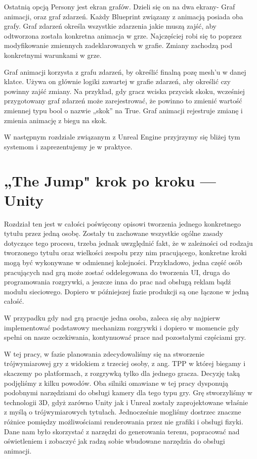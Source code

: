 \documentclass[12pt]{xmgr}
\begin{document}
Ostatnią opcją Persony jest ekran grafów. Dzieli się on na dwa ekrany- Graf animacji, oraz graf zdarzeń. Każdy Blueprint związany z animacją posiada oba grafy.
Graf zdarzeń określa wszystkie zdarzenia jakie muszą zajść, aby odtworzona została konkretna animacja w grze. Najczęściej robi się to poprzez modyfikowanie zmiennych zadeklarowanych w grafie. Zmiany zachodzą pod konkretnymi warunkami w grze.

Graf animacji korzysta z grafu zdarzeń, by określić finalną pozę mesh’u w danej klatce. Używa on głównie logiki zawartej w grafie zdarzeń, aby określić czy powinny zajść zmiany. Na przykład, gdy gracz wciska przycisk skoku, wcześniej przygotowany graf zdarzeń może zarejestrować, że powinno to zmienić wartość zmiennej typu bool o nazwie „skok” na True.  Graf animacji rejestruje zmianę i zmienia animację z biegu na skok.

W następnym rozdziale związanym  z Unreal Engine przyjrzymy się bliżej tym systemom i zaprezentujemy je w praktyce.

\chapter{„The Jump" krok po kroku — Unity}

Rozdział ten jest w całości poświęcony opisowi tworzenia jednego konkretnego tytułu przez jedną osobę. Zostały tu zachowane wszystkie ogólne zasady dotyczące tego procesu, trzeba jednak uwzględnić fakt, że w zależności od rodzaju tworzonego tytułu oraz wielkości zespołu przy nim pracującego, konkretne kroki mogą być wykonywane w odmiennej kolejności. Przykładowo, jedna część osób pracujących nad grą może zostać oddelegowana do tworzenia UI, druga do programowania rozgrywki, a jeszcze inna do prac nad obsługą reklam bądź modułu sieciowego. Dopiero w późniejszej fazie produkcji są one łączone w jedną całość.

W przypadku gdy nad grą pracuje jedna osoba, zaleca się aby najpierw implementować podstawowy mechanizm rozgrywki i dopiero w momencie gdy spełni on nasze oczekiwania, kontynuować prace nad pozostałymi częściami gry.

W tej pracy, w fazie planowania zdecydowaliśmy się na stworzenie trójwymiarowej gry z widokiem z trzeciej osoby, z ang. TPP w której biegamy i skaczemy po platformach, z rozgrywką tylko dla jednego gracza. Decyzję taką podjęliśmy z kilku powodów. Oba silniki omawiane w tej pracy dysponują podobnymi narzędziami do obsługi kamery dla tego typu gry. Grę stworzyliśmy w technologii 3D, gdyż zarówno Unity jak i Unreal zostały zaprojektowane właśnie z myślą o trójwymiarowych tytułach. Jednocześnie mogliśmy dostrzec znaczne różnice pomiędzy możliwościami renderowania przez nie grafiki i obsługi fizyki. Dane nam było skorzystać z narzędzi do generowania terenu, popracować nad oświetleniem i zobaczyć jak radzą sobie wbudowane narzędzia do obsługi animacji.
\end{document}
